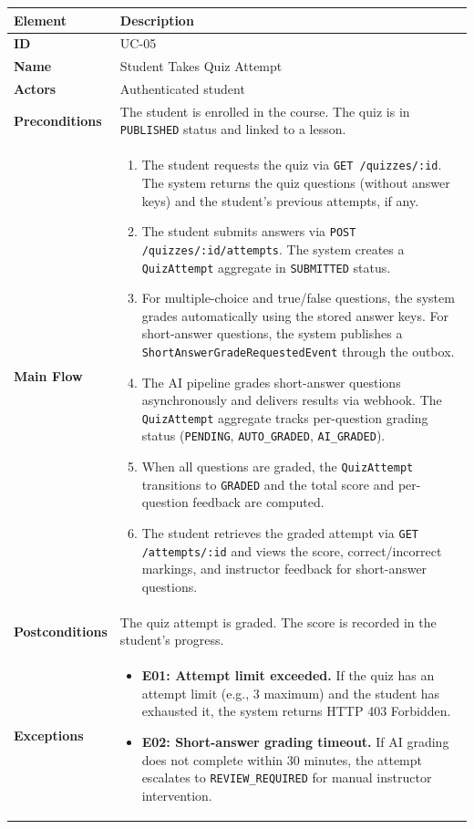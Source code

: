\begin{longtable}{p{3cm}p{10cm}}
  \toprule
  \textbf{Element} & \textbf{Description} \\
  \midrule
  \endhead
  \midrule
  \endfoot
  \textbf{ID} & UC-05 \\
  \textbf{Name} & Student Takes Quiz Attempt \\
  \textbf{Actors} & Authenticated student \\
  \textbf{Preconditions} & The student is enrolled in the course. The quiz is in \texttt{PUBLISHED} status and linked to a lesson. \\
  \textbf{Main Flow} &
  \begin{enumerate}
    \item The student requests the quiz via \texttt{GET /quizzes/:id}. The system returns the quiz questions (without answer keys) and the student's previous attempts, if any.
    \item The student submits answers via \texttt{POST /quizzes/:id/attempts}. The system creates a \texttt{QuizAttempt} aggregate in \texttt{SUBMITTED} status.
    \item For multiple-choice and true/false questions, the system grades automatically using the stored answer keys. For short-answer questions, the system publishes a \texttt{ShortAnswerGradeRequestedEvent} through the outbox.
    \item The AI pipeline grades short-answer questions asynchronously and delivers results via webhook. The \texttt{QuizAttempt} aggregate tracks per-question grading status (\texttt{PENDING}, \texttt{AUTO\_GRADED}, \texttt{AI\_GRADED}).
    \item When all questions are graded, the \texttt{QuizAttempt} transitions to \texttt{GRADED} and the total score and per-question feedback are computed.
    \item The student retrieves the graded attempt via \texttt{GET /attempts/:id} and views the score, correct/incorrect markings, and instructor feedback for short-answer questions.
  \end{enumerate} \\
  \textbf{Postconditions} & The quiz attempt is graded. The score is recorded in the student's progress. \\
  \textbf{Exceptions} &
  \begin{itemize}
    \item \textbf{E01: Attempt limit exceeded.} If the quiz has an attempt limit (e.g., 3 maximum) and the student has exhausted it, the system returns HTTP 403 Forbidden.
    \item \textbf{E02: Short-answer grading timeout.} If AI grading does not complete within 30 minutes, the attempt escalates to \texttt{REVIEW\_REQUIRED} for manual instructor intervention.
  \end{itemize} \\
  \bottomrule
\end{longtable}


